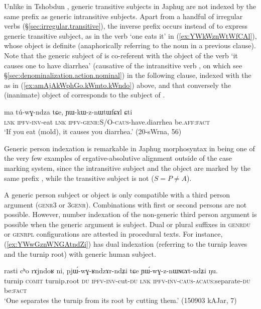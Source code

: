 Unlike in Tshobdun \citep{sun14generic}, generic transitive subjects in Japhug are not indexed by the same prefix as generic intransitive subjects. Apart from a handful of irregular verbs (§\ref{sec:irregular.transitive}), the inverse prefix  occurs instead of  to express generic transitive subject, as in the verb  `one eats it' in (\ref{ex:YWkWznWtWfCAl}), whose object is definite (anaphorically referring to the noun  in a previous clause). Note that the generic subject of  is co-referent with the object of the verb   `it causes one to have diarrhea' (causative of the intransitive verb , on which see §\ref{sec:denominalization.action.nominal}) in the following clause, indexed with the  as in (\ref{ex:amAjAkWphGo.kWmto.kWndo}) above, and that conversely the (inanimate) object of  corresponds to the subject of .

\begin{exe}
\ex   \label{ex:YWkWznWtWfCAl}
\gll  ma tú-wɣ-ndza tɕe, ɲɯ-kɯ-z-nɯtɯfɕɤl ɕti\\
\textsc{lnk} \textsc{ipfv}-\textsc{inv}-eat \textsc{lnk} \textsc{ipfv}-\textsc{genr}:S/O-\textsc{caus}-have.diarrhea be.\textsc{aff}:\textsc{fact}\\
\glt `If you eat (mold), it causes you diarrhea.' (20-sWrna, 56)
\end{exe}

Generic person indexation is remarkable in Japhug morphosyntax in being one of the very few examples of ergative-absolutive alignment outside of the case marking system, since the intransitive subject and the object are marked by the same prefix , while the transitive subject is not ($S=P \ne A$).

A generic person subject or object is only compatible with a third person argument (\textsc{genr}\fl{}3 or 3\fl{}\textsc{genr}). Combinations with first or second persons are not possible. However, number indexation of the non-generic third person argument is possible when the generic argument is subject. Dual or plural suffixes in \textsc{genr}\fl{}\textsc{du} or \textsc{genr}\fl{}\textsc{pl} configurations are attested in procedural texts. For instance, (\ref{ex:YWwGznWNGAtndZi}) has dual indexation (referring to the turnip leaves and the turnip root) with generic human subject.

\begin{exe}
\ex \label{ex:YWwGznWNGAtndZi}
\gll rasti cʰo rɤjndoʁ ni, pjɯ́-wɣ-ʁndzɤr-ndʑi tɕe ɲɯ́-wɣ-z-nɯɴɢɤt-ndʑi ŋu. \\
turnip \textsc{comit} turnip.root \textsc{du} \textsc{ipfv}-\textsc{inv}-cut-\textsc{du} \textsc{lnk} \textsc{ipfv}-\textsc{inv}-\textsc{caus}-\textsc{acaus}:separate-\textsc{du} be:\textsc{fact}\\
\glt `One separates the turnip from its root by cutting them.' (150903 kAJar, 7)
\end{exe}

